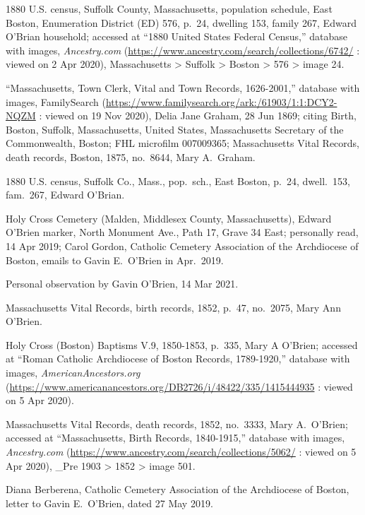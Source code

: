 \begin{thebibliography}{999}
1880 U.S. census, Suffolk County, Massachusetts, population schedule, East Boston, Enumeration District (ED) 576, p.\ 24, dwelling 153, family 267, Edward O'Brian household; accessed at ``1880 United States Federal Census,'' database with images, \textit{Ancestry.com} (\url{https://www.ancestry.com/search/collections/6742/} : viewed on 2 Apr 2020), Massachusetts > Suffolk > Boston > 576 > image 24.

``Massachusetts, Town Clerk, Vital and Town Records, 1626-2001,'' database with images, FamilySearch (\url{https://www.familysearch.org/ark:/61903/1:1:DCY2-NQZM} : viewed on 19 Nov 2020), Delia Jane Graham, 28 Jun 1869; citing Birth, Boston, Suffolk, Massachusetts, United States, Massachusetts Secretary of the Commonwealth, Boston; FHL microfilm 007009365; Massachusetts Vital Records, death records, Boston, 1875, no.\ 8644, Mary A.\ Graham.

1880 U.S. census, Suffolk Co., Mass., pop.\ sch., East Boston, p.\ 24, dwell.\ 153, fam.\ 267, Edward O'Brian.

Holy Cross Cemetery (Malden, Middlesex County, Massachusetts), Edward O'Brien marker, North Monument Ave., Path 17, Grave 34 East; personally read, 14 Apr 2019; Carol Gordon, Catholic Cemetery Association of the Archdiocese of Boston, emails to Gavin E.\ O'Brien in Apr.\ 2019.

Personal observation by Gavin O'Brien, 14 Mar 2021.

Massachusetts Vital Records, birth records, 1852, p.\ 47, no.\ 2075, Mary Ann O'Brien.

Holy Cross (Boston) Baptisms V.9, 1850-1853, p.\ 335, Mary A O'Brien; accessed at ``Roman Catholic Archdiocese of Boston Records, 1789-1920,'' database with images, \textit{AmericanAncestors.org} (\url{https://www.americanancestors.org/DB2726/i/48422/335/1415444935} : viewed on 5 Apr 2020).

Massachusetts Vital Records, death records, 1852, no.\ 3333, Mary A.\ O'Brien; accessed at ``Massachusetts, Birth Records, 1840-1915,'' database with images, \textit{Ancestry.com} (\url{https://www.ancestry.com/search/collections/5062/} : viewed on 5 Apr 2020), \_Pre 1903 > 1852 > image 501.

Diana Berberena, Catholic Cemetery Association of the Archdiocese of Boston, letter to Gavin E.\ O'Brien, dated 27 May 2019.


\end{thebibliography}
